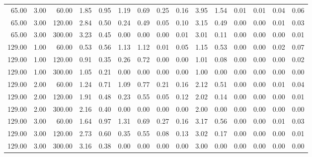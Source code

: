 \begin{table}[ht]
\begin{tabular}{rrrrrrrrrrrrrrr}
  65.00 & 3.00 & 60.00 & 1.85 & 0.95 & 1.19 & 0.69 & 0.25 & 0.16 & 3.95 & 1.54 & 0.01 & 0.01 & 0.04 & 0.06 \\ 
  65.00 & 3.00 & 120.00 & 2.84 & 0.50 & 0.24 & 0.49 & 0.05 & 0.10 & 3.15 & 0.49 & 0.00 & 0.00 & 0.01 & 0.03 \\ 
  65.00 & 3.00 & 300.00 & 3.23 & 0.45 & 0.00 & 0.00 & 0.00 & 0.01 & 3.01 & 0.11 & 0.00 & 0.00 & 0.00 & 0.01 \\ 
  129.00 & 1.00 & 60.00 & 0.53 & 0.56 & 1.13 & 1.12 & 0.01 & 0.05 & 1.15 & 0.53 & 0.00 & 0.00 & 0.02 & 0.07 \\ 
  129.00 & 1.00 & 120.00 & 0.91 & 0.35 & 0.26 & 0.72 & 0.00 & 0.00 & 1.01 & 0.08 & 0.00 & 0.00 & 0.00 & 0.02 \\ 
  129.00 & 1.00 & 300.00 & 1.05 & 0.21 & 0.00 & 0.00 & 0.00 & 0.00 & 1.00 & 0.00 & 0.00 & 0.00 & 0.00 & 0.00 \\ 
  129.00 & 2.00 & 60.00 & 1.24 & 0.71 & 1.09 & 0.77 & 0.21 & 0.16 & 2.12 & 0.51 & 0.00 & 0.00 & 0.01 & 0.04 \\ 
  129.00 & 2.00 & 120.00 & 1.91 & 0.48 & 0.23 & 0.55 & 0.05 & 0.12 & 2.02 & 0.14 & 0.00 & 0.00 & 0.00 & 0.01 \\ 
  129.00 & 2.00 & 300.00 & 2.16 & 0.40 & 0.00 & 0.00 & 0.00 & 0.00 & 2.00 & 0.00 & 0.00 & 0.00 & 0.00 & 0.00 \\ 
  129.00 & 3.00 & 60.00 & 1.64 & 0.97 & 1.31 & 0.69 & 0.27 & 0.16 & 3.17 & 0.56 & 0.00 & 0.00 & 0.01 & 0.03 \\ 
  129.00 & 3.00 & 120.00 & 2.73 & 0.60 & 0.35 & 0.55 & 0.08 & 0.13 & 3.02 & 0.17 & 0.00 & 0.00 & 0.00 & 0.01 \\ 
  129.00 & 3.00 & 300.00 & 3.16 & 0.38 & 0.00 & 0.00 & 0.00 & 0.00 & 3.00 & 0.00 & 0.00 & 0.00 & 0.00 & 0.00 \\ 
   \hline
\end{tabular}
\end{table}
